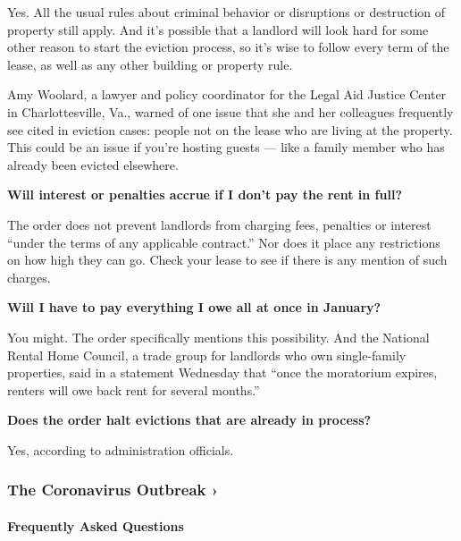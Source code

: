 Yes. All the usual rules about criminal behavior or disruptions or
destruction of property still apply. And it's possible that a landlord
will look hard for some other reason to start the eviction process, so
it's wise to follow every term of the lease, as well as any other
building or property rule.

Amy Woolard, a lawyer and policy coordinator for the Legal Aid Justice
Center in Charlottesville, Va., warned of one issue that she and her
colleagues frequently see cited in eviction cases: people not on the
lease who are living at the property. This could be an issue if you're
hosting guests --- like a family member who has already been evicted
elsewhere.

\textbf{Will interest or penalties accrue if I don't pay the rent in
full?}

The order does not prevent landlords from charging fees, penalties or
interest ``under the terms of any applicable contract.'' Nor does it
place any restrictions on how high they can go. Check your lease to see
if there is any mention of such charges.

\textbf{Will I have to pay everything I owe all at once in January?}

You might. The order specifically mentions this possibility. And the
National Rental Home Council, a trade group for landlords who own
single-family properties, said in a statement Wednesday that ``once the
moratorium expires, renters will owe back rent for several months.''

\textbf{Does the order halt evictions that are already in process?}

Yes, according to administration officials.

\href{https://www.nytimes3xbfgragh.onion/news-event/coronavirus?action=click\&pgtype=Article\&state=default\&region=MAIN_CONTENT_3\&context=storylines_faq}{}

\hypertarget{the-coronavirus-outbreak-}{%
\subsubsection{The Coronavirus Outbreak
›}\label{the-coronavirus-outbreak-}}

\hypertarget{frequently-asked-questions}{%
\paragraph{Frequently Asked
Questions}\label{frequently-asked-questions}}

